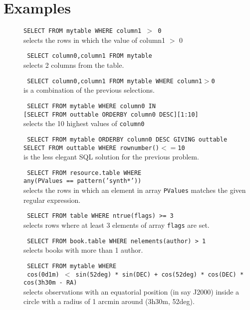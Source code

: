 \section{Examples}
\begin{description}
  \item[] \texttt{SELECT FROM mytable WHERE column1 $>$ 0 }
    \\selects the rows in which the value of column1 $>$ 0
  \item[] \texttt{ SELECT column0,column1 FROM mytable }
    \\selects 2 columns from the table.
  \item[] \texttt{ SELECT column0,column1 FROM mytable WHERE column1$>$0 }
    \\is a combination of the previous selections.
  \item[] \texttt{ SELECT FROM mytable WHERE column0 IN}
       \\\texttt{[SELECT FROM outtable ORDERBY column0 DESC][1:10] }
       \\selects the 10 highest values of \texttt{column0}
  \item[] \texttt{ SELECT FROM mytable ORDERBY column0 DESC GIVING outtable}
       \\\texttt{SELECT FROM outtable WHERE rownumber()$<=$10 }
       \\is the less elegant SQL solution for the previous problem.
  \item[] \texttt{ SELECT FROM resource.table WHERE}
       \\\texttt{any(PValues == pattern('synth*'))}
       \\selects the rows in which an element in array
       \texttt{PValues} matches the given regular expression.
  \item[] \texttt{ SELECT FROM table WHERE ntrue(flags) >= 3}
    \\selects rows where at least 3 elements of array \texttt{flags}
    are set.
  \item[] \texttt{ SELECT FROM book.table WHERE nelements(author) > 1}
    \\selects books with more than 1 author.
  \item[] \texttt{ SELECT FROM mytable WHERE}
       \\\texttt{ cos(0d1m) $<$
         sin(52deg) * sin(DEC) + cos(52deg) * cos(DEC) *
         cos(3h30m - RA) }
       \\selects observations with an equatorial position (in say J2000)
       inside a circle with a radius of 1 arcmin around (3h30m, 52deg).

\end{description}
